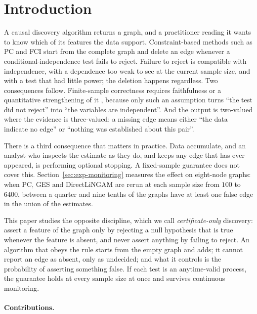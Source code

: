 
\section{Introduction}\label{sec:intro}

A causal discovery algorithm returns a graph, and a practitioner reading it
wants to know which of its features the data support. Constraint-based methods
such as PC and FCI
\citep{spirtes2000causation,spirtes1995causal,colombo2012learning} start from
the complete graph and delete an edge whenever a conditional-independence test
fails to reject. Failure to reject is compatible with independence, with a
dependence too weak to see at the current sample size, and with a test that had
little power; the deletion happens regardless. Two consequences follow.
Finite-sample correctness requires faithfulness or a quantitative strengthening
of it \citep{robins2003uniform,uhler2013geometry}, because only such an
assumption turns ``the test did not reject'' into ``the variables are
independent''. And the output is two-valued where the evidence is three-valued:
a missing edge means either ``the data indicate no edge'' or ``nothing was
established about this pair''.

There is a third consequence that matters in practice. Data accumulate, and an
analyst who inspects the estimate as they do, and keeps any edge that has ever
appeared, is performing optional stopping. A fixed-sample guarantee does not
cover this. Section~\ref{sec:exp-monitoring} measures the effect on eight-node
graphs: when PC, GES and DirectLiNGAM are rerun at each sample size from $100$
to $6400$, between a quarter and nine tenths of the graphs have at least one
false edge in the union of the estimates.

This paper studies the opposite discipline, which we call \emph{certificate-only}
discovery: assert a feature of the graph only by rejecting a null hypothesis
that is true whenever the feature is absent, and never assert anything by
failing to reject. An algorithm that obeys the rule starts from the empty graph
and adds; it cannot report an edge as absent, only as undecided; and what it
controls is the probability of asserting something false. If each test is an
anytime-valid process, the guarantee holds at every sample size at once and
survives continuous monitoring.

\paragraph{Contributions.}

